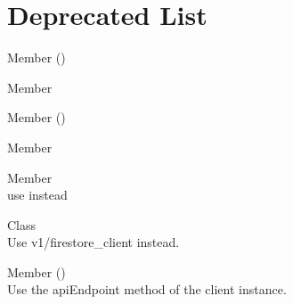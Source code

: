 \chapter{Deprecated List}
\hypertarget{deprecated}{}\label{deprecated}

\begin{DoxyRefList}
\item[Member \doxylink{tslib_8es6_8js_aab3141f45ac988c300766986519ab289}{\+\_\+\+\_\+spread} ()]\hfill \\
\label{deprecated__deprecated000040}%
%
  
\item[Member \doxylink{tslib_8js_a88187ed26160e41bc80c62ea77d9b605}{\+\_\+\+\_\+spread} ]\hfill \\
\label{deprecated__deprecated000042}%
%
  
\item[Member \doxylink{tslib_8es6_8js_a373ef4cffd9efcc8393e53720a925381}{\+\_\+\+\_\+spread\+Arrays} ()]\hfill \\
\label{deprecated__deprecated000041}%
%
  
\item[Member \doxylink{tslib_8js_a7c4518276c213cb6ea33516e681e5b19}{\+\_\+\+\_\+spread\+Arrays} ]\hfill \\
\label{deprecated__deprecated000043}%
%
  
\item[Member \doxylink{baseexternalclient_8js_ae1bcf25458fb1614e36ebb008cc4f920}{CLOUD\+\_\+\+RESOURCE\+\_\+\+MANAGER} ]\hfill \\
\label{deprecated__deprecated000037}%
%
use {\ttfamily {}} instead  
\item[Class \doxylink{class_firestore_client}{Firestore\+Client} ]\hfill \\
\label{deprecated__deprecated000003}%
%
Use v1/firestore\+\_\+client instead.


\item[Member \doxylink{class_firestore_client_a64cd2b0f2e7176841afe0ce34436b5e0}{Firestore\+Client\+::api\+Endpoint} ()]\hfill \\
\label{deprecated__deprecated000002}%
%
Use the api\+Endpoint method of the client instance. 


\end{DoxyRefList}
